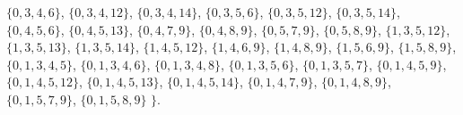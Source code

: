 \(\{0,3,4,6\}\),\allowbreak\space
\(\{0,3,4,12\}\),\allowbreak\space
\(\{0,3,4,14\}\),\allowbreak\space
\(\{0,3,5,6\}\),\allowbreak\space
\(\{0,3,5,12\}\),\allowbreak\space
\(\{0,3,5,14\}\),\allowbreak\space
\(\{0,4,5,6\}\),\allowbreak\space
\(\{0,4,5,13\}\),\allowbreak\space
\(\{0,4,7,9\}\),\allowbreak\space
\(\{0,4,8,9\}\),\allowbreak\space
\(\{0,5,7,9\}\),\allowbreak\space
\(\{0,5,8,9\}\),\allowbreak\space
\(\{1,3,5,12\}\),\allowbreak\space
\(\{1,3,5,13\}\),\allowbreak\space
\(\{1,3,5,14\}\),\allowbreak\space
\(\{1,4,5,12\}\),\allowbreak\space
\(\{1,4,6,9\}\),\allowbreak\space
\(\{1,4,8,9\}\),\allowbreak\space
\(\{1,5,6,9\}\),\allowbreak\space
\(\{1,5,8,9\}\),\allowbreak\space
\(\{0,1,3,4,5\}\),\allowbreak\space
\(\{0,1,3,4,6\}\),\allowbreak\space
\(\{0,1,3,4,8\}\),\allowbreak\space
\(\{0,1,3,5,6\}\),\allowbreak\space
\(\{0,1,3,5,7\}\),\allowbreak\space
\(\{0,1,4,5,9\}\),\allowbreak\space
\(\{0,1,4,5,12\}\),\allowbreak\space
\(\{0,1,4,5,13\}\),\allowbreak\space
\(\{0,1,4,5,14\}\),\allowbreak\space
\(\{0,1,4,7,9\}\),\allowbreak\space
\(\{0,1,4,8,9\}\),\allowbreak\space
\(\{0,1,5,7,9\}\),\allowbreak\space
\(\{0,1,5,8,9\}\)\allowbreak\space
\(\}.\)\par
\endgroup

